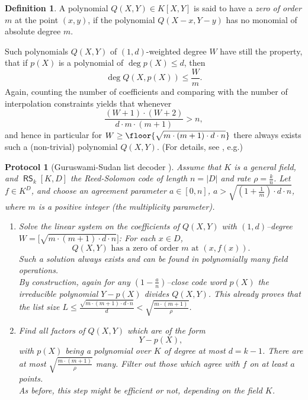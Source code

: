 \documentclass[11pt]{article}
\newtheorem{protocol}[]{Protocol}
\theoremstyle{definition}
\newtheorem{defn}[thm]{Definition}
\theoremstyle{remark}
\DeclareMathOperator{\RS}{\mathsf{RS}}
\begin{document}
\begin{defn}
A polynomial $Q(X,Y)\in K[X,Y]$ is said to have a \textit{zero of order $m$} at the point $(x,y)$, if the polynomial $Q(X-x,Y-y)$ has no monomial of absolute degree $m$.
\end{defn}

Such polynomials $Q(X,Y)$ of $(1,d)$-weighted degree $W$ have still the property, that if $p(X)$ is a polynomial of $\deg p(X) \leq d$, then 
\[
\deg Q(X,p(X))\leq \frac{W}{m}.
\] 
Again, counting the number of coefficients and comparing with the number of interpolation constraints yields that whenever 
\[
\frac{(W+1)\cdot (W+2)}{d \cdot m \cdot (m+1)} > n,
\]
and hence in particular for
$
W \geq \floor{\sqrt{m\cdot (m+1) \cdot d\cdot n}}
$
there always exists such a (non-trivial) polynomial $Q(X,Y)$.
(For details, see \cite{ListDecodingBook}, e.g.)

\begin{protocol}[Guruswami-Sudan list decoder \cite{GuruswamiSudan}] 
\label{p:GuruswamiSudan}
Assume that $K$ is a general field, and $\RS_k[K,D]$ the Reed-Solomon code of length $n= |D|$ and rate $\rho=\frac{k}{n}$.
Let $f\in K^D$, and choose an agreement parameter $a\in [0,n]$,  
$a > \sqrt{\left(1 + \frac{1}{m}\right) \cdot d\cdot n}$,
where $m$ is a positive integer (the \textit{multiplicity parameter}).
\begin{enumerate}
\item
Solve the linear system on the coefficients of  $Q(X,Y)$ with $(1,d)$--degree $W = \big[\sqrt{m\cdot (m+1)\cdot d\cdot n}\big]$: 
For each $x\in D$,
\[ 
Q(X,Y)\text{ has a zero of order $m$ at } (x, f(x)).
\]
Such a solution always exists and can be found in polynomially many field operations.
\\
{\tiny
By construction, again for any $\left(1-\frac{a}{n}\right)$--close code word $p(X)$ the irreducible polynomial $Y-p(X)$ divides $Q(X,Y)$.
This already proves that the list size $L\leq \frac{\sqrt{m\cdot (m+1)\cdot d\cdot n}}{d} < \sqrt{\frac{m\cdot (m+1)}{\rho}}$.  
}
\item
Find all factors of $Q(X,Y)$ which are of the form
\[
Y - p(X),
\] 
with $p(X)$ being a polynomial over $K$ of degree at most $d=k-1$. 
There are at most $\sqrt{\frac{m\cdot (m+1)}{\rho}}$ many. 
Filter out those which agree with $f$ on at least $a$ points.
\\
{\tiny
As before, this step might be efficient or not, depending on the field $K$.
}
\end{enumerate}
\end{protocol}
\end{document}
